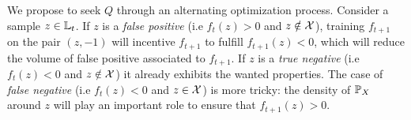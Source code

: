     
  
We propose to seek $Q$ through an alternating optimization process. Consider a sample $z\in\mathbb{L}_t$. If $z$ is a \textit{false positive} (i.e $f_t(z)>0$ and $z\notin\mathcal{X}$), training $f_{t+1}$ on the pair $(z,-1)$ will incentive $f_{t+1}$ to fulfill $f_{t+1}(z)<0$, which will reduce the volume of false positive associated to $f_{t+1}$. If $z$ is a \textit{true negative} (i.e $f_t(z)<0$ and $z\notin\mathcal{X}$) it already exhibits the wanted properties. The case of \textit{false negative} (i.e $f_t(z)<0$ and $z\in\mathcal{X}$) is more tricky: the density of $\mathbb{P}_X$ around $z$ will play an important role to ensure that $f_{t+1}(z)>0$.  
  
